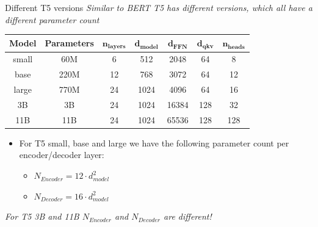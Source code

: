 \begin{frame}{Different T5 versions}
	\textit{Similar to BERT T5 has different versions, which all have a different parameter count} 
	
	\hspace{}
	
	\begin{table}[h!]
	\centering
	\small %
	\begin{tabular}{|c|c|c|c|c|c|c|}
	\hline
	\textbf{Model} & \textbf{Parameters} & $\bm{n_{layers}}$ & $\bm{d_{model}}$ & $\bm{d_{FFN}}$ & $\bm{d_{qkv}}$ & $\bm{n_{heads}}$ \\ \hline
	small  & 60M  & 6  & 512  & 2048 & 64 & 8 \\ \hline
	base   & 220M & 12 & 768  & 3072 & 64 & 12 \\ \hline
	large  & 770M & 24 & 1024 & 4096 & 64 & 16 \\ \hline
	3B     & 3B   & 24 & 1024 & 16384 & 128 & 32 \\ \hline
	11B    & 11B  & 24 & 1024 & 65536 & 128 & 128 \\ \hline
	\end{tabular}
	\end{table}
	
	\begin{itemize}
		\item For T5 small, base and large we have the following parameter count per encoder/decoder layer:
		\begin{itemize}
			\item $N_{Encoder} = 12\cdot d_{model}^2$
			\item $N_{Decoder} = 16\cdot d_{model}^2$
		\end{itemize}
	\end{itemize}
	
	\hspace{}
	
	\textit{For T5 3B and 11B $N_{Encoder}$ and $N_{Decoder}$ are different!}
		
	\end{frame}
	
	
	
	
